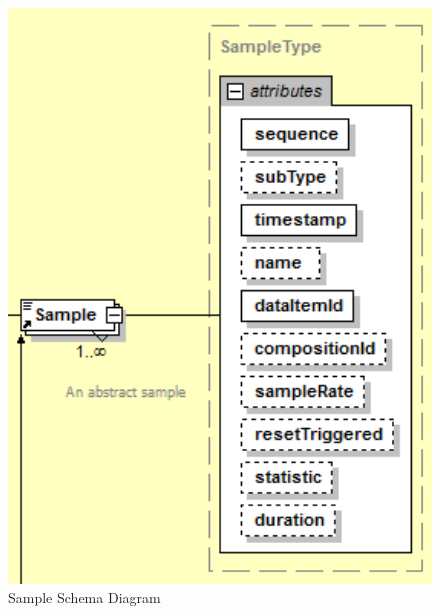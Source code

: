 \FloatBarrier


\begin{figure}[ht]
  \centering
    \includegraphics[width=1.0\textwidth]{figures/Sample Schema.png}
  \caption{Sample Schema Diagram}
  \label{fig:Sample Schema Diagram}
\end{figure}

\FloatBarrier


